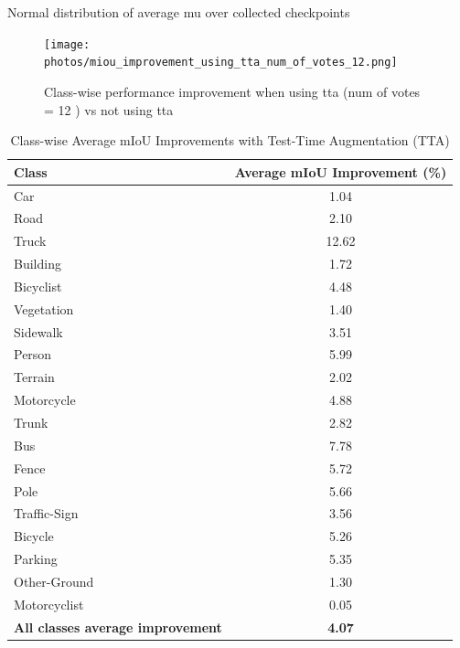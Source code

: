 \documentclass[10pt,twocolumn,letterpaper]{article}
\begin{document}
Normal distribution of average mu over collected checkpoints 





\begin{figure}[!h]
    \centering
    \texttt{[image: photos/miou\_improvement\_using\_tta\_num\_of\_votes\_12.png]}
    \caption{Class-wise performance improvement when using tta (num of votes = 12 ) vs not using tta}
    \label{fig:photo_example}
\end{figure}


\begin{table}[!h]
\centering
\begin{tabular}{l c}
\hline
Class & Average mIoU Improvement (\%) \\
\hline
Car & 1.04 \\
Road & 2.10 \\
Truck & 12.62 \\
Building & 1.72 \\
Bicyclist & 4.48 \\
Vegetation & 1.40 \\
Sidewalk & 3.51 \\
Person & 5.99 \\
Terrain & 2.02 \\
Motorcycle & 4.88 \\
Trunk & 2.82 \\
Bus & 7.78 \\
Fence & 5.72 \\
Pole & 5.66 \\
Traffic-Sign & 3.56 \\
Bicycle & 5.26 \\
Parking & 5.35 \\
Other-Ground & 1.30 \\
Motorcyclist & 0.05 \\
\hline
\textbf{All classes average improvement} & \textbf{4.07} \\\hline
\end{tabular}
\caption{Class-wise Average mIoU Improvements with Test-Time Augmentation (TTA)}
\label{tab:tta_miou_improvements}
\end{table}
\end{document}
